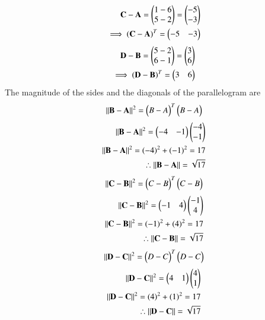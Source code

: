 \documentclass[journal,12pt,onecolumn]{IEEEtran}
\begin{document}
            \begin{align}
            \mathbf{C-A}=\begin{pmatrix}1-6\\5-2\end{pmatrix}=\begin{pmatrix}-5\\-3\end{pmatrix}\\
            \implies \mathbf{(C-A)}^T=\begin{pmatrix}-5 & -3\end{pmatrix}\\
            \end{align}
            \begin{align}
            \mathbf{D-B}=\begin{pmatrix}5-2\\6-1\end{pmatrix}=\begin{pmatrix}3\\6\end{pmatrix}\\
            \implies \mathbf{(D-B)}^T=\begin{pmatrix}3 & 6\end{pmatrix}\\
        \end{align} 
        The magnitude of the sides and the diagonals of the parallelogram are\\
        \begin{align}
            \|\mathbf{B-A}\|^2=\begin{pmatrix}B-A\end{pmatrix}^T\begin{pmatrix}B-A\end{pmatrix}\\
        \end{align}
    \begin{align}
            \|\mathbf{B-A}\|^2=\begin{pmatrix}-4 & -1\end{pmatrix}\begin{pmatrix}-4\\-1\end{pmatrix}\\
            \|\mathbf{B-A}\|^2=(-4)^2+(-1)^2=17\\
            \therefore \|\mathbf{B-A}\|=\sqrt{17}
        \end{align}
        \begin{align}
            \|\mathbf{C-B}\|^2=\begin{pmatrix}C-B\end{pmatrix}^T\begin{pmatrix}C-B\end{pmatrix}
        \end{align}
        \begin{align}
            \|\mathbf{C-B}\|^2=\begin{pmatrix}-1 & 4\end{pmatrix}\begin{pmatrix}-1\\4\end{pmatrix}\\
            \|\mathbf{C-B}\|^2=(-1)^2+(4)^2=17\\
            \therefore \|\mathbf{C-B}\|=\sqrt{17}
        \end{align}
        \begin{align}
            \|\mathbf{D-C}\|^2=\begin{pmatrix}D-C\end{pmatrix}^T\begin{pmatrix}D-C\end{pmatrix}
        \end{align}
        \begin{align}
            \|\mathbf{D-C}\|^2=\begin{pmatrix}4 & 1\end{pmatrix}\begin{pmatrix}4\\1\end{pmatrix}\\
            \|\mathbf{D-C}\|^2=(4)^2+(1)^2=17\\
            \therefore \|\mathbf{D-C}\|=\sqrt{17}
        \end{align}
\end{document}

